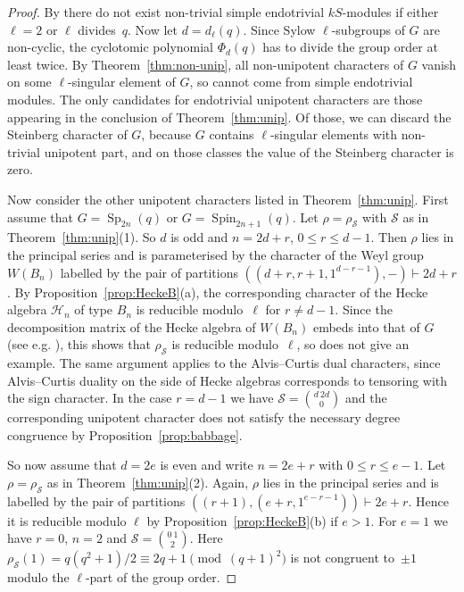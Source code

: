 \documentclass{ert-l}
\newcommand{\cH}{{\mathcal{H}}}
\newcommand{\cS}{{\mathcal{S}}}
\newcommand{\Sp}{{\operatorname{Sp}}}
\newcommand{\Spin}{{\operatorname{Spin}}}
\theoremstyle{definition}
\theoremstyle{remark}
\begin{document}
\begin{proof}
By \cite[Thms.~6.7 and~5.2]{LMS13} there do not exist non-trivial simple
endotrivial $kS$-modules if either $\ell=2$ or $\ell$ divides~$q$.
Now let $d=d_\ell(q)$. Since Sylow $\ell$-subgroups of $G$
are non-cyclic, the cyclotomic polynomial $\Phi_d(q)$ has to divide the group
order at least twice. By Theorem~\ref{thm:non-unip}, all non-unipotent
characters of $G$ vanish on some $\ell$-singular element of $G$, so cannot
come from simple endotrivial modules. The only candidates for endotrivial
unipotent characters are those appearing in the conclusion of
Theorem~\ref{thm:unip}. Of those, we can discard the Steinberg character
of $G$, because $G$ contains $\ell$-singular elements with non-trivial unipotent
part, and on those classes the value of the Steinberg character is zero.
\par
Now consider the other unipotent characters listed in Theorem~\ref{thm:unip}.
First assume that $G=\Sp_{2n}(q)$ or $G=\Spin_{2n+1}(q)$. Let $\rho=\rho_\cS$
with $\cS$ as in Theorem~\ref{thm:unip}(1). So $d$ is odd and $n=2d+r$,
$0\le r\le d-1$.  Then $\rho$
lies in the principal series and is parameterised by the character of the Weyl
group $W(B_n)$ labelled by the pair of partitions
$((d+r,r+1,1^{d-r-1}),-)\vdash 2d+r$. By Proposition~\ref{prop:HeckeB}(a), the
corresponding character of the Hecke algebra $\cH_n$ of type $B_n$ is
reducible modulo~$\ell$ for $r\ne d-1$. Since the decomposition matrix of the
Hecke algebra of $W(B_n)$ embeds into that of $G$ (see e.g.{}
\cite[Thm.~4.1.14]{GJ11}), this shows that $\rho_\cS$ is reducible
modulo~$\ell$, so does not give an example. The same argument applies to the
Alvis--Curtis dual characters, since Alvis--Curtis duality on the side of
Hecke algebras corresponds to tensoring with the sign character. In the case
$r=d-1$ we have $\cS=\binom{d\ 2d}{0}$ and the corresponding unipotent
character does not satisfy the necessary degree congruence by
Proposition~\ref{prop:babbage}.
\par
So now assume that $d=2e$ is even and write $n=2e+r$ with $0\le r\le e-1$.
Let $\rho=\rho_\cS$ as in Theorem~\ref{thm:unip}(2). Again, $\rho$ lies in
the principal series and is labelled by the pair of partitions
$((r+1),(e+r,1^{e-r-1}))\vdash 2e+r$. Hence it is reducible modulo $\ell$
by Proposition~\ref{prop:HeckeB}(b) if $e>1$. For $e=1$ we have $r=0$, $n=2$
and $\cS=\binom{0\ 1}{2}$. Here
$\rho_\cS(1)=q(q^2+1)/2\equiv 2q+1\pmod{(q+1)^2}$ is not congruent to~$\pm1$
modulo the $\ell$-part of the group order. \par


\end{proof}
\end{document}
